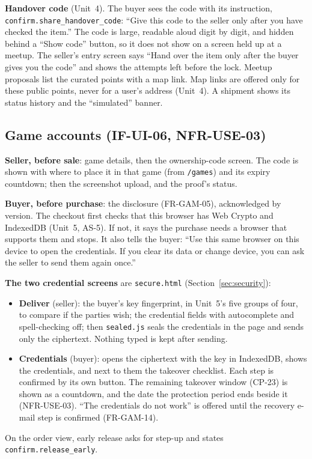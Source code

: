 \documentclass[11pt,a4paper]{article}
\begin{document}
\textbf{Handover code} (Unit~4). The buyer sees the code with its instruction, \texttt{confirm.\allowbreak share\_handover\_code}: ``Give this code to the seller only after you have checked the item.'' The code is large, readable aloud digit by digit, and hidden behind a ``Show code'' button, so it does not show on a screen held up at a meetup. The seller's entry screen says ``Hand over the item only after the buyer gives you the code'' and shows the attempts left before the lock. Meetup proposals list the curated points with a map link. Map links are offered only for these public points, never for a user's address (Unit~4). A shipment shows its status history and the ``simulated'' banner.

\subsection{Game accounts (IF-UI-06, NFR-USE-03)}
\textbf{Seller, before sale}: game details, then the ownership-code screen. The code is shown with where to place it in that game (from \texttt{/games}) and its expiry countdown; then the screenshot upload, and the proof's status.

\textbf{Buyer, before purchase}: the disclosure (FR-GAM-05), acknowledged by version. The checkout first checks that this browser has Web Crypto and IndexedDB (Unit~5, AS-5). If not, it says the purchase needs a browser that supports them and stops. It also tells the buyer: ``Use this same browser on this device to open the credentials. If you clear its data or change device, you can ask the seller to send them again once.''

\textbf{The two credential screens} are \texttt{secure.html} (Section~\ref{sec:security}):
\begin{itemize}[nosep]
  \item \textbf{Deliver} (seller): the buyer's key fingerprint, in Unit~5's five groups of four, to compare if the parties wish; the credential fields with autocomplete and spell-checking off; then \texttt{sealed.js} seals the credentials in the page and sends only the ciphertext. Nothing typed is kept after sending.
  \item \textbf{Credentials} (buyer): opens the ciphertext with the key in IndexedDB, shows the credentials, and next to them the takeover checklist. Each step is confirmed by its own button. The remaining takeover window (CP-23) is shown as a countdown, and the date the protection period ends beside it (NFR-USE-03). ``The credentials do not work'' is offered until the recovery e-mail step is confirmed (FR-GAM-14).
\end{itemize}
On the order view, early release asks for step-up and states \texttt{confirm.release\_early}.
\end{document}
